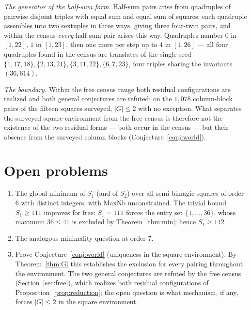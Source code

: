 \documentclass[11pt]{article}
\begin{document}
\emph{The generator of the half-sum form.} Half-sum pairs arise from
quadruples of pairwise disjoint triples with equal sum and equal sum
of squares: each quadruple assembles into two sextuples in three
ways, giving three four-twin pairs, and within the census
\emph{every} half-sum pair arises this way. Quadruples number $0$ in
$[1,22]$, $1$ in $[1,23]$, then one more per step up to $4$ in
$[1,26]$ --- all four quadruples found in the census are translates
of the single seed
$\{1,17,18\},\{2,13,21\},\{3,11,22\},\{6,7,23\}$, four triples
sharing the invariants $(36,614)$.

\emph{The boundary.} Within the free census range both residual
configurations are realized and both general conjectures are
refuted; on the $1{,}078$ column-block pairs of the fifteen squares
surveyed, $|G|\le 2$ with no exception. What separates the surveyed
square environment from the free census is therefore not the
existence of the two residual forms --- both occur in the census ---
but their absence from the surveyed column blocks
(Conjecture~\ref{conj:world}).

\section{Open problems}

\begin{enumerate}
\item The global minimum of $S_1$ (and of $S_2$) over all semi-bimagic
squares of order $6$ with distinct integers, with $\mathrm{MaxNb}$
unconstrained. The trivial bound $S_1\ge 111$ improves for free:
$S_1=111$ forces the entry set $\{1,\dots,36\}$, whose maximum
$36\le 41$ is excluded by Theorem~\ref{thm:min}; hence $S_1\ge 112$.
\item The analogous minimality question at order $7$.
\item Prove Conjecture~\ref{conj:world} (uniqueness in the square
environment). By Theorem~\ref{thm:G} this establishes the exclusion
for every pairing throughout the environment. The two general
conjectures are refuted by the free census (Section~\ref{sec:free}),
which realizes both residual configurations of
Proposition~\ref{prop:reduction}; the open question is what
mechanism, if any, forces $|G|\le 2$ in the square environment.
\end{enumerate}
\end{document}
